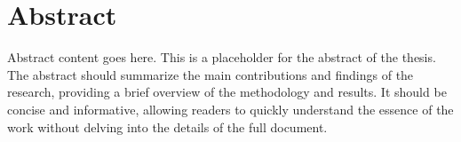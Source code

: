 \chapter*{Abstract}

Abstract content goes here. This is a placeholder for the abstract of the thesis. The abstract should summarize the main contributions and findings of the research, providing a brief overview of the methodology and results. It should be concise and informative, allowing readers to quickly understand the essence of the work without delving into the details of the full document.